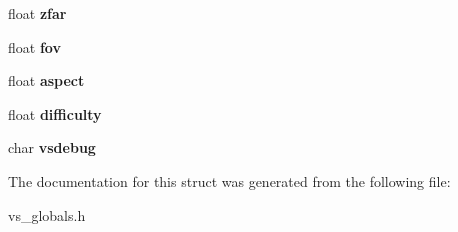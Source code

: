 \begin{DoxyCompactItemize}
\item 
float {\bfseries zfar}\hypertarget{structgame__data__t_a513460aee5ee2467871fa2589e0e1e69}{}\label{structgame__data__t_a513460aee5ee2467871fa2589e0e1e69}

\item 
float {\bfseries fov}\hypertarget{structgame__data__t_a11f933866affe330345ef2277baf50e2}{}\label{structgame__data__t_a11f933866affe330345ef2277baf50e2}

\item 
float {\bfseries aspect}\hypertarget{structgame__data__t_a5df4f8439877885e693bc66c8601dd01}{}\label{structgame__data__t_a5df4f8439877885e693bc66c8601dd01}

\item 
float {\bfseries difficulty}\hypertarget{structgame__data__t_a81575e7c247809983f1390928e91ae67}{}\label{structgame__data__t_a81575e7c247809983f1390928e91ae67}

\item 
char {\bfseries vsdebug}\hypertarget{structgame__data__t_a1a85ed1c9da250e471c0463fccb91423}{}\label{structgame__data__t_a1a85ed1c9da250e471c0463fccb91423}

\end{DoxyCompactItemize}


The documentation for this struct was generated from the following file\+:\begin{DoxyCompactItemize}
\item 
vs\+\_\+globals.\+h\end{DoxyCompactItemize}
